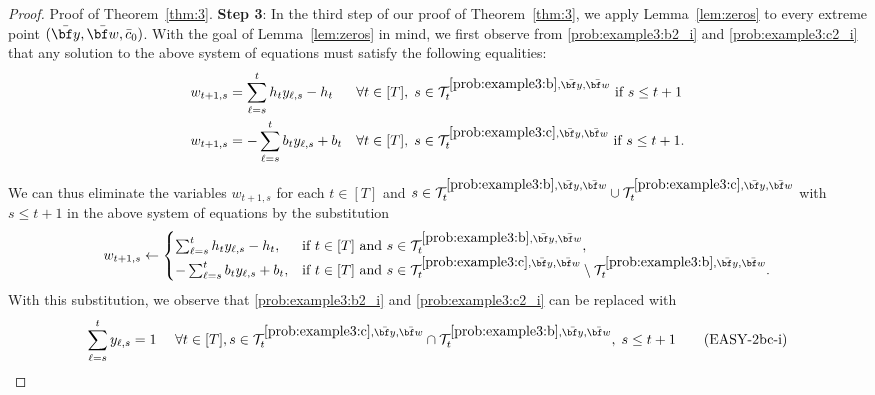 \documentclass[nonblindrev,mnsc]{informs3} %
\newcommand{\bw}{{\bf w}}
\newcommand{\by}{{\bf y}}
\begin{document}
\begin{APPENDICES}
\begin{proof}{Proof of Theorem~\ref{thm:3}.}
 \textbf{Step 3}: In the third step of our proof of Theorem~\ref{thm:3}, we apply Lemma~\ref{lem:zeros} to every extreme point $(\bar{\by},\bar{\bw},\bar{c}_0)$. With the goal of Lemma~\ref{lem:zeros} in mind, we first observe from \eqref{prob:example3:b2_i} and \eqref{prob:example3:c2_i} that  any solution to the above system of equations must satisfy the following equalities:
 \begin{align*}
     w_{t+1,s} &= \sum_{\ell=s}^t h_t y_{\ell,s} - h_t && \forall t \in [T], \; s \in\mathcal{T}^{\ref{prob:example3:b},\bar{\by},\bar{\bw}}_t \text{ if } s \le t + 1\\
     w_{t+1,s} &= - \sum_{\ell=s}^t b_t y_{\ell,s} + b_t && \forall t \in [T], \; s \in\mathcal{T}^{\ref{prob:example3:c},\bar{\by},\bar{\bw}}_t  \text{ if } s \le t + 1. 
 \end{align*}

We can thus eliminate the variables $w_{t+1,s}$ for each $t\in [T]$ and $s\in \mathcal{T}^{\ref{prob:example3:b},\bar{\by},\bar{\bw}}_t \cup \mathcal{T}^{\ref{prob:example3:c},\bar{\by},\bar{\bw}}_t$ with $s \le t + 1$ in the above system of equations by the substitution 
\begin{align*}
    w_{t+1,s} \leftarrow \begin{cases}
    \sum_{\ell=s}^t h_t y_{\ell,s} - h_t,&\text{if } t \in [T] \text{ and }s \in\mathcal{T}^{\ref{prob:example3:b},\bar{\by},\bar{\bw}}_t,\\
    - \sum_{\ell=s}^t b_t y_{\ell,s} + b_t,&\text{if } t \in [T] \text{ and }  s \in  \mathcal{T}^{\ref{prob:example3:c},\bar{\by},\bar{\bw}}_t  \setminus \mathcal{T}^{\ref{prob:example3:b},\bar{\by},\bar{\bw}}_t.
    \end{cases}
\end{align*}
With this substitution, we observe that \eqref{prob:example3:b2_i} and \eqref{prob:example3:c2_i} can be replaced with
\begin{align}
    \sum_{\ell=s}^t y_{\ell,s}=1 ~~~~\forall t\in [T], s\in \mathcal{T}^{\ref{prob:example3:c},\bar{\by},\bar{\bw}}_t \cap \mathcal{T}^{\ref{prob:example3:b},\bar{\by},\bar{\bw}}_t, \; s \le t + 1 \tag{EASY-2bc-i} \label{prob:example3:bc'2}
\end{align}


\end{proof}
\end{APPENDICES}
\end{document}
